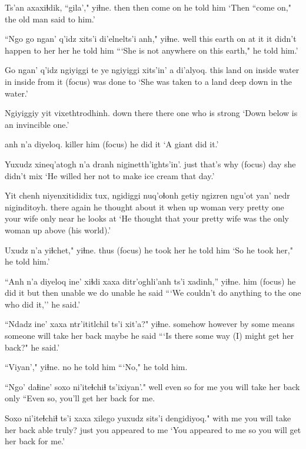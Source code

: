 \documentclass[12pt]{article}
\begin{document}
\gll Ts'an axaxiɬdik, ``gila'," yiɬne.
then then {come on} {he told him}
\glt `Then ``come on," the old man said to him.'
\glend

\gll ``Ngo go ngan' q'idz xits'i di'elnelts'i anh," yiɬne.
well this earth on {at it} {it didn't happen to her} her {he told him}
\glt ```She is not anywhere on this earth," he told him.'
\glend

\gll Go ngan' q'idz ngiyiggi te ye ngiyiggi xits'in' a di'alyoq.
this land on inside water in inside {from it} {{(focus)}} {was done to}
\glt `She was taken to a land deep down in the water.'
\glend

\gll Ngiyiggiy yit vixethtrodhinh.
{down there} there {one who is strong}
\glt `Down below is an invincible one.'
\glend

 anh n'a diyeloq.
killer him {(focus)} {he did it}
\glt `A giant did it.'
\glend

\gll Yuxudz xineq'atogh n'a dranh niginetth'ights'in'.
just  {that's why} {(focus)}   day {she didn't mix}
\glt `He willed her not to make ice cream that day.'
\glend

\gll Yit chenh niyenxitididix tux, ngidiggi nuq'oɬonh getiy ngizren ngu'ot yan' nedr niginditoyh.
there again {he thought about it} when up woman very {pretty one} {your wife} only near {he looks at}
\glt `He thought that your pretty wife was the only woman up above (his world).'
\glend

\gll Uxudz n'a yiɬchet," yiɬne.
thus {(focus)} {he took her} {he told him}
\glt `So he took her," he told him.'
\glend

\gll ``Anh n'a diyeloq ine' xiɬdi xaxa ditr'oghli'anh ts'i xadinh,'' yiɬne.
him {(focus)} {he did it} but then unable {we do} {} unable {he said}
\glt ```We couldn't do anything to the one who did it,'' he said.'
\glend

\gll ``Ndadz ine' xaxa ntr'ititlchil ts'i xit'a?" yiɬne.
somehow however {by some means} {someone will take her back} {} maybe {he said}
\glt ```Is there some way (I) might get her back?" he said.'
\glend

\gll ``Viyan'," yiɬne. 
no {he told him} 
\glt ```No," he told him. 
\glend

\gll ``Ngo' daɬine' soxo ni'iteɬchiɬ ts'ixiyan'."
well {even so} {for me} {you will take her back} only
\glt ``Even so, you'll get her back for me.
\glend

\gll Soxo ni'iteɬchiɬ ts'i xaxa xilego yuxudz {sits'i dengidiyoq.}"
{with me} {you will take her back} {} able truly? just {you appeared to me}
\glt `You appeared to me so you will get her back for me.'
\glend
\end{document}
